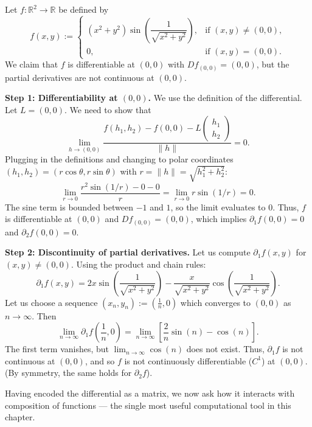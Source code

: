 \begin{example}
\label{ex:differentiable_not_c1}
Let $f : \mathbb{R}^2 \to \mathbb{R}$ be defined by
\[
f(x,y) := \begin{cases}
  (x^2+y^2)\sin\left(\dfrac{1}{\sqrt{x^2+y^2}}\right), & \text{if } (x,y) \neq (0,0), \\
  0, & \text{if } (x,y) = (0,0).
\end{cases}
\]
We claim that $f$ is differentiable at $(0,0)$ with $Df_{(0,0)} = (0, 0)$, but the partial derivatives are not continuous at $(0,0)$. 

\textbf{Step 1: Differentiability at $(0,0)$.} We use the definition of the differential. Let $L = (0, 0)$. We need to show that
\[
  \lim_{h \to (0,0)} \frac{f(h_1, h_2) - f(0,0) - L\begin{pmatrix}h_1\\h_2\end{pmatrix}}{\|h\|} = 0.
\]
Plugging in the definitions and changing to polar coordinates $(h_1, h_2) = (r\cos\theta, r\sin\theta)$ with $r = \|h\| = \sqrt{h_1^2+h_2^2}$:
\[
  \lim_{r \to 0} \frac{r^2 \sin(1/r) - 0 - 0}{r} = \lim_{r \to 0} r \sin(1/r) = 0.
\]
The sine term is bounded between $-1$ and $1$, so the limit evaluates to $0$. Thus, $f$ is differentiable at $(0,0)$ and $Df_{(0,0)} = (0, 0)$, which implies $\partial_1 f(0,0) = 0$ and $\partial_2 f(0,0) = 0$.

\textbf{Step 2: Discontinuity of partial derivatives.} Let us compute $\partial_1 f(x,y)$ for $(x,y) \neq (0,0)$. Using the product and chain rules:
\[
  \partial_1 f(x,y) = 2x \sin\left(\frac{1}{\sqrt{x^2+y^2}}\right) - \frac{x}{\sqrt{x^2+y^2}} \cos\left(\frac{1}{\sqrt{x^2+y^2}}\right).
\]
Let us choose a sequence $(x_n, y_n) := (\frac{1}{n}, 0)$ which converges to $(0,0)$ as $n \to \infty$. Then
\[
  \lim_{n \to \infty} \partial_1 f\left(\frac{1}{n}, 0\right) = \lim_{n \to \infty} \left[ \frac{2}{n} \sin(n) - \cos(n) \right].
\]
The first term vanishes, but $\lim_{n \to \infty} \cos(n)$ does not exist. Thus, $\partial_1 f$ is not continuous at $(0,0)$, and so $f$ is not continuously differentiable ($C^1$) at $(0,0)$. (By symmetry, the same holds for $\partial_2 f$).
\end{example}

Having encoded the differential as a matrix, we now ask how it interacts with composition of
functions --- the single most useful computational tool in this chapter.

